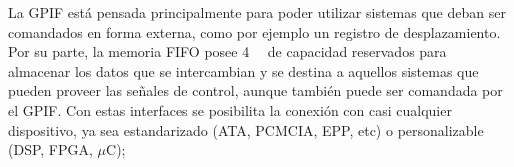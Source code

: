 La GPIF está pensada principalmente para poder utilizar sistemas que deban ser comandados en forma externa, como por ejemplo un registro de desplazamiento. Por su parte, la memoria FIFO posee \SI{4}{\kilo\byte} de capacidad reservados para almacenar los datos que se intercambian y se destina a aquellos sistemas que pueden proveer las señales de control, aunque también puede ser comandada por el GPIF. Con estas interfaces se posibilita la conexión con casi cualquier dispositivo, ya sea estandarizado (ATA, PCMCIA, EPP, etc) o personalizable (DSP, FPGA, $\mu$C);



 

